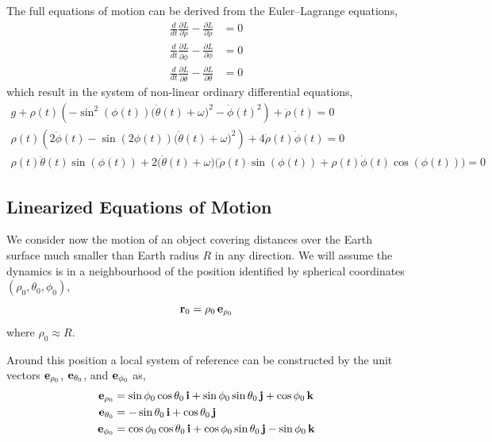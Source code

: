 \documentclass[12pt]{article}
\begin{document}
The full equations of motion can be derived from the Euler--Lagrange equations,
\begin{align}
  \frac{d}{dt}\frac{\partial L}{\partial\dot\rho} - \frac{\partial L}{\partial\rho} &= 0 \\
  \frac{d}{dt}\frac{\partial L}{\partial\dot\phi} - \frac{\partial L}{\partial\phi} &= 0 \\
  \frac{d}{dt}\frac{\partial L}{\partial\dot\theta} - \frac{\partial L}{\partial\theta} &= 0
\end{align}
which result in the system of non-linear ordinary differential equations,
\begin{equation}
  \begin{gathered}
    g + \rho(t)\left(-\sin^2(\phi(t))\bigl(\dot\theta(t)+\omega\bigr)^2 - \dot\phi(t)^2\right)
      + \ddot\rho(t) = 0 \\
    \rho(t)\left(2\ddot\phi(t) - \sin(2\phi(t))\bigl(\dot\theta(t)+\omega\bigr)^2\right)
      + 4\dot\rho(t)\dot\phi(t) = 0 \\
    \rho(t)\ddot\theta(t)\sin(\phi(t))
      + 2\bigl(\dot\theta(t)+\omega\bigr)\bigl(\dot\rho(t)\sin(\phi(t))
        + \rho(t)\dot\phi(t)\cos(\phi(t))\bigr) = 0
  \end{gathered}
  \label{earth:spherical-equations-of-motion}
\end{equation}

\subsection{Linearized Equations of Motion}

We consider now the motion of an object covering distances over the Earth surface much
smaller than Earth radius $R$ in any direction. We will assume the dynamics is in a
neighbourhood of the position identified by spherical coordinates $(\rho_0, \theta_0, \phi_0)$,
\begin{equation}
  \vb{r}_0 = \rho_0\,\vb{e}_{\rho_0}
\end{equation}
where $\rho_0 \approx R$.

Around this position a local system of reference can be constructed by the unit vectors
$\vb{e}_{\rho_0}$, $\vb{e}_{\theta_0}$, and $\vb{e}_{\phi_0}$ as,
\begin{align}
  \vb{e}_{\rho_0}   &= \sin\phi_0\cos\theta_0\,\vb{i} + \sin\phi_0\sin\theta_0\,\vb{j} + \cos\phi_0\,\vb{k} \\
  \vb{e}_{\theta_0} &= -\sin\theta_0\,\vb{i} + \cos\theta_0\,\vb{j} \\
  \vb{e}_{\phi_0}   &= \cos\phi_0\cos\theta_0\,\vb{i} + \cos\phi_0\sin\theta_0\,\vb{j} - \sin\phi_0\,\vb{k}
\end{align}
\end{document}
